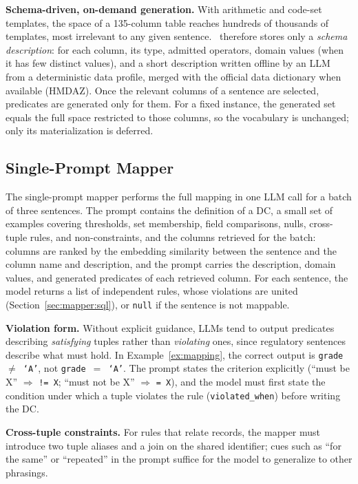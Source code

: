 \smallskip\noindent\textbf{Schema-driven, on-demand generation.}
With arithmetic and code-set templates, the space of a 135-column table reaches hundreds of thousands of templates, most irrelevant to any given sentence. \system\ therefore stores only a \emph{schema description}: for each column, its type, admitted operators, domain values (when it has few distinct values), and a short description written offline by an LLM from a deterministic data profile, merged with the official data dictionary when available (HMDAZ). Once the relevant columns of a sentence are selected, predicates are generated only for them. For a fixed instance, the generated set equals the full space restricted to those columns, so the vocabulary is unchanged; only its materialization is deferred.

\subsection{Single-Prompt Mapper}
\label{sec:mapper:llm}

The single-prompt mapper performs the full mapping in one LLM call for a batch of three sentences. The prompt contains the definition of a DC, a small set of examples covering thresholds, set membership, field comparisons, nulls, cross-tuple rules, and non-constraints, and the columns retrieved for the batch: columns are ranked by the embedding similarity between the sentence and the column name and description, and the prompt carries the description, domain values, and generated predicates of each retrieved column. For each sentence, the model returns a list of independent rules, whose violations are united (Section~\ref{sec:mapper:sql}), or \texttt{null} if the sentence is not mappable.

\smallskip\noindent\textbf{Violation form.}
Without explicit guidance, LLMs tend to output predicates describing \emph{satisfying} tuples rather than \emph{violating} ones, since regulatory sentences describe what must hold. In Example~\ref{ex:mapping}, the correct output is \texttt{grade $\neq$ `A'}, not \texttt{grade $=$ `A'}. The prompt states the criterion explicitly (``must be X'' $\Rightarrow$ \texttt{!= X}; ``must not be X'' $\Rightarrow$ \texttt{= X}), and the model must first state the condition under which a tuple violates the rule (\texttt{violated\_when}) before writing the DC.

\smallskip\noindent\textbf{Cross-tuple constraints.}
For rules that relate records, the mapper must introduce two tuple aliases and a join on the shared identifier; cues such as ``for the same'' or ``repeated'' in the prompt suffice for the model to generalize to other phrasings.


